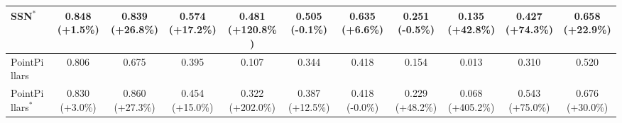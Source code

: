 \begin{table}[htpb]
\begin{tabular}{lcccccccccc}
    SSN$^*$ & 0.848 (+1.5\%) & 0.839 (+26.8\%) & 0.574 (+17.2\%) & 0.481 (+120.8\%) & 0.505 (-0.1\%) & 0.635 (+6.6\%) & 0.251 (-0.5\%) & 0.135 (+42.8\%) & 0.427 (+74.3\%) & 0.658 (+22.9\%) \\
    \midrule
    PointPillars & 0.806 & 0.675 & 0.395 & 0.107 & 0.344 & 0.418 & 0.154 & 0.013 & 0.310 & 0.520 \\
    PointPillars$^*$ & 0.830 (+3.0\%) & 0.860 (+27.3\%) & 0.454 (+15.0\%) & 0.322 (+202.0\%) & 0.387 (+12.5\%) & 0.418 (-0.0\%) & 0.229 (+48.2\%) & 0.068 (+405.2\%) & 0.543 (+75.0\%) & 0.676 (+30.0\%) \\
    \bottomrule
    \end{tabular}
    \label{tab:ap_results_1.0}
\end{table}
